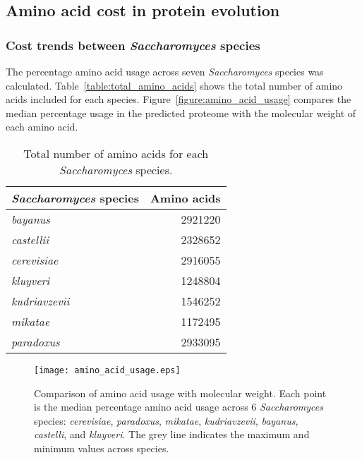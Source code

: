 \subsection{Amino acid cost in protein evolution}

\subsubsection{Cost trends between \emph{Saccharomyces} species}

The percentage amino acid usage across seven \emph{Saccharomyces} species was calculated. Table~\vref{table:total_amino_acids} shows the total number of amino acids included for each species. Figure~\vref{figure:amino_acid_usage} compares the median percentage usage in the predicted proteome with the molecular weight of each amino acid.

\begin{table}
  \centering
  \begin{tabular}{ l r }
                                                  \toprule
    \emph{Saccharomyces} species & Amino acids \\ \midrule
    \emph{bayanus}               & 2921220     \\
    \emph{castellii}             & 2328652     \\
    \emph{cerevisiae}            & 2916055     \\
    \emph{kluyveri}              & 1248804     \\
    \emph{kudriavzevii}          & 1546252     \\
    \emph{mikatae}               & 1172495     \\
    \emph{paradoxus}             & 2933095     \\ \bottomrule
  \end{tabular}
  \caption{Total number of amino acids for each \emph{Saccharomyces} species.}
  \label{table:total_amino_acids}
\end{table}

\begin{figure}
  \centering
  \texttt{[image: amino\_acid\_usage.eps]}
  \caption[Comparison of amino acid usage with molecular weight]{Comparison of amino acid usage with molecular weight. Each point is the median percentage amino acid usage across 6 \emph{Saccharomyces} species: \emph{cerevisiae}, \emph{paradoxus}, \emph{mikatae}, \emph{kudriavzevii}, \emph{bayanus}, \emph{castelli}, and \emph{kluyveri}. The grey line indicates the maximum and minimum values across species.}
  \label{figure:amino_acid_usage}
\end{figure}

